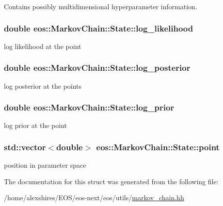 Contains possibly multidimensional hyperparameter information. \hypertarget{structeos_1_1MarkovChain_1_1State_a0876fac286eb6eb52165389cfcc9e602}{
\subsubsection[{log\_\-likelihood}]{\setlength{\rightskip}{0pt plus 5cm}double {\bf eos::MarkovChain::State::log\_\-likelihood}}}
\label{structeos_1_1MarkovChain_1_1State_a0876fac286eb6eb52165389cfcc9e602}


log likelihood at the point \hypertarget{structeos_1_1MarkovChain_1_1State_a893de1735354ecbfa51b34655fb28833}{
\subsubsection[{log\_\-posterior}]{\setlength{\rightskip}{0pt plus 5cm}double {\bf eos::MarkovChain::State::log\_\-posterior}}}
\label{structeos_1_1MarkovChain_1_1State_a893de1735354ecbfa51b34655fb28833}


log posterior at the points \hypertarget{structeos_1_1MarkovChain_1_1State_a4fa9205eb7785b52cc97f13714a3f62b}{
\subsubsection[{log\_\-prior}]{\setlength{\rightskip}{0pt plus 5cm}double {\bf eos::MarkovChain::State::log\_\-prior}}}
\label{structeos_1_1MarkovChain_1_1State_a4fa9205eb7785b52cc97f13714a3f62b}


log prior at the point \hypertarget{structeos_1_1MarkovChain_1_1State_a13518a1ded09d2c61dbfc2cc40297b94}{
\subsubsection[{point}]{\setlength{\rightskip}{0pt plus 5cm}std::vector$<$double$>$ {\bf eos::MarkovChain::State::point}}}
\label{structeos_1_1MarkovChain_1_1State_a13518a1ded09d2c61dbfc2cc40297b94}


position in parameter space 

The documentation for this struct was generated from the following file:\begin{DoxyCompactItemize}
\item 
/home/alexshires/EOS/eos-\/next/eos/utils/\hyperlink{markov__chain_8hh}{markov\_\-chain.hh}\end{DoxyCompactItemize}
